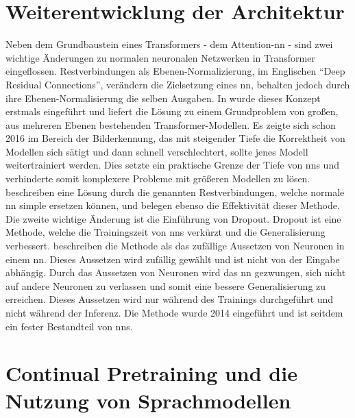\section{Weiterentwicklung der Architektur}
Neben dem Grundbaustein eines Transformers - dem Attention-\ac{nn} - sind zwei wichtige Änderungen zu normalen neuronalen Netzwerken in Transformer eingeflossen. 
Restverbindungen als Ebenen-Normalizierung, im Englischen \enquote{Deep Residual Connections}, verändern die Zielsetzung eines \ac{nn}, behalten jedoch durch ihre Ebenen-Normalisierung die selben Ausgaben. 
In \citet{deep_residual} wurde dieses Konzept erstmals eingeführt und liefert die Lösung zu einem Grundproblem von großen, aus mehreren Ebenen bestehenden Transformer-Modellen. 
Es zeigte sich schon 2016 im Bereich der Bilderkennung, das mit steigender Tiefe die Korrektheit von Modellen sich sätigt und dann schnell verschlechtert, sollte jenes Modell weitertrainiert werden. 
Dies setzte ein praktische Grenze der Tiefe von \ac{nn}s und verhinderte somit komplexere Probleme mit größeren Modellen zu lösen. 
\citet{deep_residual} beschreiben eine Lösung durch die genannten Restverbindungen, welche normale \ac{nn} simple ersetzen können, und belegen ebenso die Effektivität dieser Methode.\\

Die zweite wichtige Änderung ist die Einführung von Dropout. 
Dropout ist eine Methode, welche die Trainingszeit von \ac{nn}s verkürzt und die Generalisierung verbessert. 
\citet{dropout} beschreiben die Methode als das zufällige Aussetzen von Neuronen in einem \ac{nn}. 
Dieses Aussetzen wird zufällig gewählt und ist nicht von der Eingabe abhängig. 
Durch das Aussetzen von Neuronen wird das \ac{nn} gezwungen, sich nicht auf andere Neuronen zu verlassen und somit eine bessere Generalisierung zu erreichen. 
Dieses Aussetzen wird nur während des Trainings durchgeführt und nicht während der Inferenz. 
Die Methode wurde 2014 eingeführt und ist seitdem ein fester Bestandteil von \ac{nn}s.\\

\section{Continual Pretraining und die Nutzung von Sprachmodellen}

